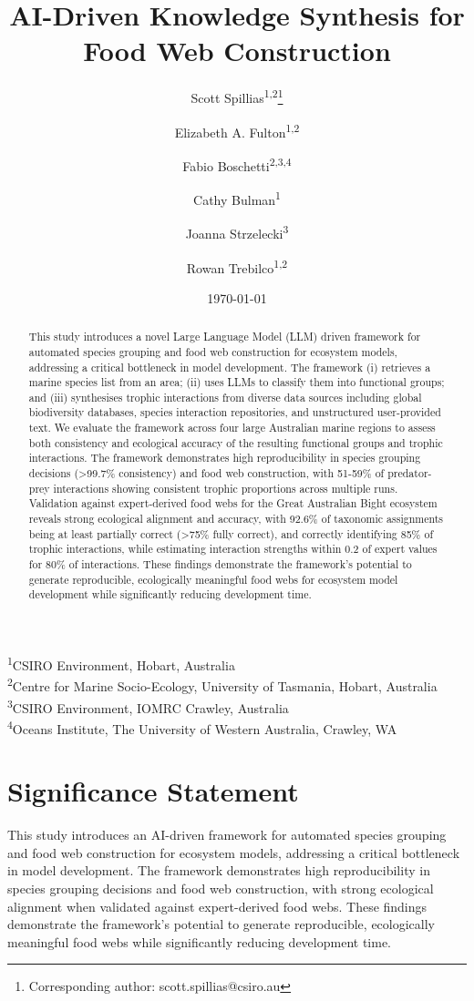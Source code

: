 \documentclass[12pt,a4paper]{article}
\title{AI-Driven Knowledge Synthesis for Food Web Construction}
\author{Scott Spillias\textsuperscript{1,2}\thanks{Corresponding author: scott.spillias@csiro.au} \and
Elizabeth A. Fulton\textsuperscript{1,2} \and
Fabio Boschetti\textsuperscript{2,3,4} \and
Cathy Bulman\textsuperscript{1} \and
Joanna Strzelecki\textsuperscript{3} \and
Rowan Trebilco\textsuperscript{1,2}}
\date{\today}  %
\newcommand{\affiliations}{
\noindent\textsuperscript{1}CSIRO Environment, Hobart, Australia\\
\textsuperscript{2}Centre for Marine Socio-Ecology, University of Tasmania, Hobart, Australia\\
\textsuperscript{3}CSIRO Environment, IOMRC Crawley, Australia\\
\textsuperscript{4}Oceans Institute, The University of Western Australia, Crawley, WA\\
}
\begin{document}
\maketitle
\affiliations

\section*{Significance Statement}
This study introduces an AI-driven framework for automated species grouping and food web construction for ecosystem models, addressing a critical bottleneck in model development. The framework demonstrates high reproducibility in species grouping decisions and food web construction, with strong ecological alignment when validated against expert-derived food webs. These findings demonstrate the framework's potential to generate reproducible, ecologically meaningful food webs while significantly reducing development time.

\begin{abstract}
This study introduces a novel Large Language Model (LLM) driven framework for automated species grouping and food web construction for ecosystem models, addressing a critical bottleneck in model development. The framework (i) retrieves a marine species list from an area; (ii) uses LLMs to classify them into functional groups; and (iii) synthesises trophic interactions from diverse data sources including global biodiversity databases, species interaction repositories, and unstructured user-provided text. We evaluate the framework across four large Australian marine regions to assess both consistency and ecological accuracy of the resulting functional groups and trophic interactions. The framework demonstrates high reproducibility in species grouping decisions (>99.7\% consistency) and food web construction, with 51-59\% of predator-prey interactions showing consistent trophic proportions across multiple runs. Validation against expert-derived food webs for the Great Australian Bight ecosystem reveals strong ecological alignment and accuracy, with 92.6\% of taxonomic assignments being at least partially correct (>75\% fully correct), and correctly identifying 85\% of trophic interactions, while estimating interaction strengths within 0.2 of expert values for 80\% of interactions. These findings demonstrate the framework's potential to generate reproducible, ecologically meaningful food webs for ecosystem model development while significantly reducing development time.
\end{abstract}
\end{document}
